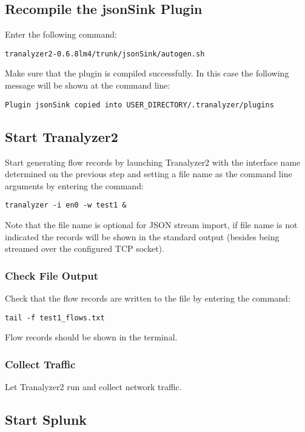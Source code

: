 \documentclass[documentation]{subfiles}
\begin{document}
\subsection{Recompile the jsonSink Plugin}

Enter the following command:
\begin{verbatim}
tranalyzer2-0.6.8lm4/trunk/jsonSink/autogen.sh
\end{verbatim}
Make sure that the plugin is compiled successfully. In this case the
following message will be shown at the command line:
\begin{verbatim}
Plugin jsonSink copied into USER_DIRECTORY/.tranalyzer/plugins
\end{verbatim}

\subsection{Start Tranalyzer2}

Start generating flow records by launching Tranalyzer2 with the interface
name determined on the previous step and setting a file name as the
command line arguments by entering the command:
\begin{verbatim}
tranalyzer -i en0 -w test1 &
\end{verbatim}

Note that the file name is optional for JSON stream import, if file
name is not indicated the records will be shown in the standard output
(besides being streamed over the configured TCP socket).

\subsubsection{Check File Output}

Check that the flow records are written to the file by entering the
command:
\begin{verbatim}
tail -f test1_flows.txt
\end{verbatim}
Flow records should be shown in the terminal.

\subsubsection{Collect Traffic}

Let Tranalyzer2 run and collect network traffic.

\subsection{Start Splunk}
\end{document}
